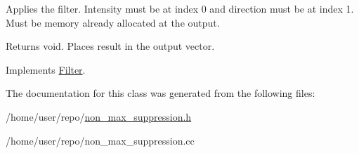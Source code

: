 Applies the filter. Intensity must be at index 0 and direction must be at index 1. Must be memory already allocated at the output. 

\begin{DoxyReturn}{Returns}
void. Places result in the output vector. 
\end{DoxyReturn}


Implements \hyperlink{classFilter_afab0d50af44a19a370ebe46c69b8ff4e}{Filter}.



The documentation for this class was generated from the following files\+:\begin{DoxyCompactItemize}
\item 
/home/user/repo/\hyperlink{non__max__suppression_8h}{non\+\_\+max\+\_\+suppression.\+h}\item 
/home/user/repo/non\+\_\+max\+\_\+suppression.\+cc\end{DoxyCompactItemize}
